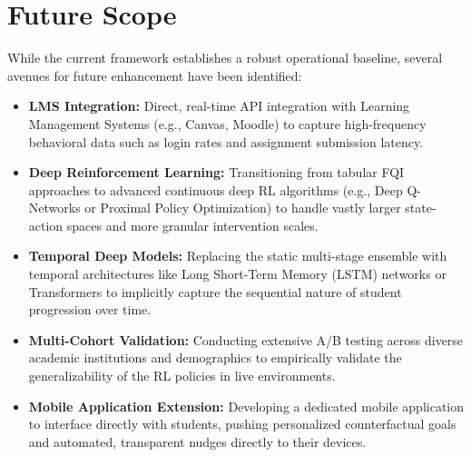 \documentclass[12pt,a4paper]{report}
\begin{document}
\section{Future Scope}
While the current framework establishes a robust operational baseline, several avenues for future enhancement have been identified:
\begin{itemize}
    \item \textbf{LMS Integration:} Direct, real-time API integration with Learning Management Systems (e.g., Canvas, Moodle) to capture high-frequency behavioral data such as login rates and assignment submission latency.
    \item \textbf{Deep Reinforcement Learning:} Transitioning from tabular FQI approaches to advanced continuous deep RL algorithms (e.g., Deep Q-Networks or Proximal Policy Optimization) to handle vastly larger state-action spaces and more granular intervention scales.
    \item \textbf{Temporal Deep Models:} Replacing the static multi-stage ensemble with temporal architectures like Long Short-Term Memory (LSTM) networks or Transformers to implicitly capture the sequential nature of student progression over time.
    \item \textbf{Multi-Cohort Validation:} Conducting extensive A/B testing across diverse academic institutions and demographics to empirically validate the generalizability of the RL policies in live environments.
    \item \textbf{Mobile Application Extension:} Developing a dedicated mobile application to interface directly with students, pushing personalized counterfactual goals and automated, transparent nudges directly to their devices.
\end{itemize}
\end{document}
